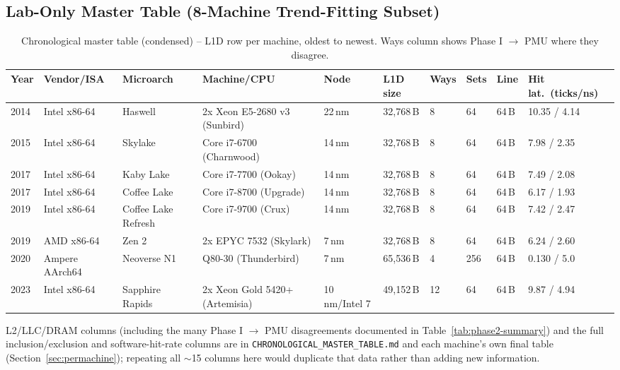 \documentclass{article}
\begin{document}
\subsection{Lab-Only Master Table (8-Machine Trend-Fitting Subset)}

\begin{table}[H]
\centering
{\tiny\setlength{\tabcolsep}{3pt}
\caption{Chronological master table (condensed) -- L1D row per machine, oldest to newest. Ways column shows Phase I $\to$ PMU where they disagree.}
\label{tab:master-lab-condensed}
\begin{tabularx}{\textwidth}{|l|l|X|X|l|l|l|l|l|l|}
\hline
Year & Vendor/ISA & Microarch & Machine/CPU & Node & L1D size & Ways & Sets & Line & Hit lat.\ (ticks/ns)\\
\hline
2014 & Intel x86-64 & Haswell & 2x Xeon E5-2680 v3 (Sunbird) & 22\,nm & 32,768\,B & 8 & 64 & 64\,B & 10.35 / 4.14\\
2015 & Intel x86-64 & Skylake & Core i7-6700 (Charnwood) & 14\,nm & 32,768\,B & 8 & 64 & 64\,B & 7.98 / 2.35\\
2017 & Intel x86-64 & Kaby Lake & Core i7-7700 (Ookay) & 14\,nm & 32,768\,B & 8 & 64 & 64\,B & 7.49 / 2.08\\
2017 & Intel x86-64 & Coffee Lake & Core i7-8700 (Upgrade) & 14\,nm & 32,768\,B & 8 & 64 & 64\,B & 6.17 / 1.93\\
2019 & Intel x86-64 & Coffee Lake Refresh & Core i7-9700 (Crux) & 14\,nm & 32,768\,B & 8 & 64 & 64\,B & 7.42 / 2.47\\
2019 & AMD x86-64 & Zen 2 & 2x EPYC 7532 (Skylark) & 7\,nm & 32,768\,B & 8 & 64 & 64\,B & 6.24 / 2.60\\
2020 & Ampere AArch64 & Neoverse N1 & Q80-30 (Thunderbird) & 7\,nm & 65,536\,B & 4 & 256 & 64\,B & 0.130 / 5.0\\
2023 & Intel x86-64 & Sapphire Rapids & 2x Xeon Gold 5420+ (Artemisia) & 10\,nm/Intel 7 & 49,152\,B & 12 & 64 & 64\,B & 9.87 / 4.94\\
\hline
\end{tabularx}
}
\end{table}

L2/LLC/DRAM columns (including the many Phase I $\to$ PMU disagreements documented in
Table~\ref{tab:phase2-summary}) and the full inclusion/exclusion and software-hit-rate
columns are in \texttt{CHRONOLOGICAL\_MASTER\_TABLE.md} and each machine's own final table
(Section~\ref{sec:permachine}); repeating all $\sim$15 columns here would duplicate that
data rather than adding new information.
\end{document}
